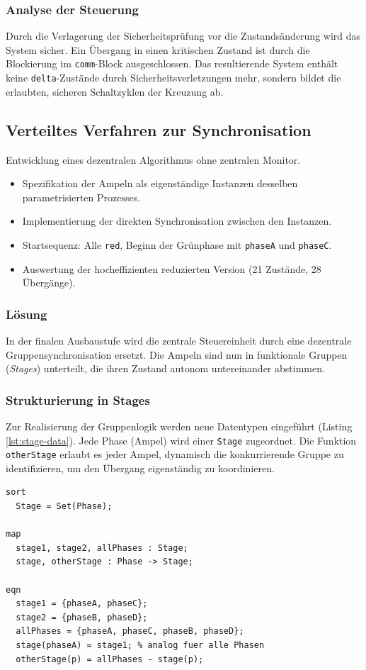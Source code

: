 \documentclass{article}
\begin{document}
\subsubsection{Analyse der Steuerung}
Durch die Verlagerung der Sicherheitsprüfung vor die Zustandsänderung wird das System sicher. 
Ein Übergang in einen kritischen Zustand ist durch die Blockierung im \texttt{comm}-Block ausgeschlossen. 
Das resultierende System enthält keine \texttt{delta}-Zustände durch Sicherheitsverletzungen mehr, sondern bildet die erlaubten, sicheren Schaltzyklen der Kreuzung ab. 


\subsection{Verteiltes Verfahren zur Synchronisation}
Entwicklung eines dezentralen Algorithmus ohne zentralen Monitor.
\begin{itemize}
    \item Spezifikation der Ampeln als eigenständige Instanzen desselben parametrisierten Prozesses.
    \item Implementierung der direkten Synchronisation zwischen den Instanzen.
    \item Startsequenz: Alle \texttt{red}, Beginn der Grünphase mit \texttt{phaseA} und \texttt{phaseC}.
    \item Auswertung der hocheffizienten reduzierten Version (21 Zustände, 28 Übergänge).
\end{itemize}

\subsubsection{Lösung}
In der finalen Ausbaustufe wird die zentrale Steuereinheit durch eine dezentrale Gruppensynchronisation ersetzt. 
Die Ampeln sind nun in funktionale Gruppen (\textit{Stages}) unterteilt, die ihren Zustand autonom untereinander abstimmen.

\subsubsection{Strukturierung in Stages}
Zur Realisierung der Gruppenlogik werden neue Datentypen eingeführt (Listing \ref{lst:stage-data}). 
Jede Phase (Ampel) wird einer \texttt{Stage} zugeordnet. 
Die Funktion \texttt{otherStage} erlaubt es jeder Ampel, dynamisch die konkurrierende Gruppe zu identifizieren, um den Übergang eigenständig zu koordinieren.

\begin{lstlisting}[caption={Definition der Stage-Logik}, label={lst:stage-data}]
sort
  Stage = Set(Phase);

map
  stage1, stage2, allPhases : Stage;
  stage, otherStage : Phase -> Stage;

eqn
  stage1 = {phaseA, phaseC};
  stage2 = {phaseB, phaseD};
  allPhases = {phaseA, phaseC, phaseB, phaseD};
  stage(phaseA) = stage1; % analog fuer alle Phasen
  otherStage(p) = allPhases - stage(p);
\end{lstlisting}
\end{document}
